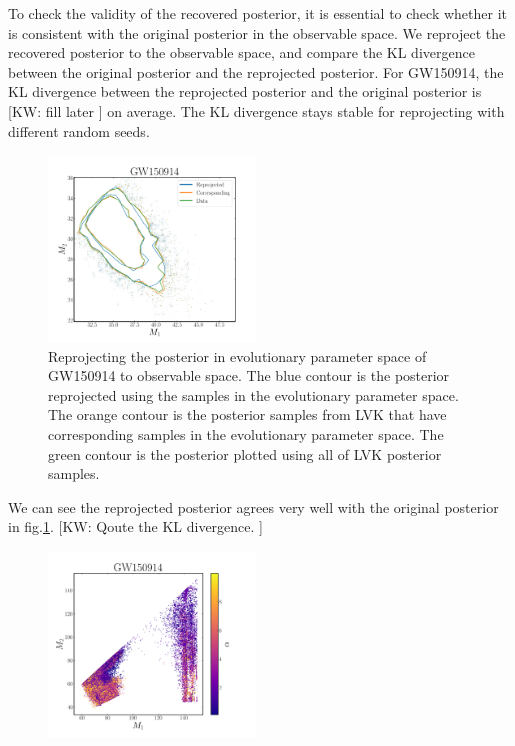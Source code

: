 \documentclass[twocolumn]{aastex631}
\newcommand{\kw}[1]{{\color{rb4}[KW: #1 ]}}
\begin{document}
To check the validity of the recovered posterior, it is essential to check whether it is consistent with the original posterior in the observable space.
We reproject the recovered posterior to the observable space, and compare the KL divergence between the original posterior and the reprojected posterior.
For GW150914, the KL divergence between the reprojected posterior and the original posterior is \kw{fill later} on average.
The KL divergence stays stable for reprojecting with different random seeds.


\begin{figure}
\includegraphics[width=0.49\textwidth]{static/GW150914_reprojection.pdf}
\caption{Reprojecting the posterior in evolutionary parameter space of GW150914 to observable space.
The blue contour is the posterior reprojected using the samples in the evolutionary parameter space.
The orange contour is the posterior samples from LVK that have corresponding samples in the evolutionary parameter space.
The green contour is the posterior plotted using all of LVK posterior samples.
}
\label{fig:GW150914_reprojection}
\end{figure}

We can see the reprojected posterior agrees very well with the original posterior in fig.\ref{fig:GW150914_reprojection}.
\kw{Qoute the KL divergence.}



\begin{figure}
\includegraphics[width=0.49\textwidth]{static/GW150914_m1m2alpha.png}
\caption{}
\label{fig:GW150914_m1_m2_alpha}
\end{figure}
\end{document}
